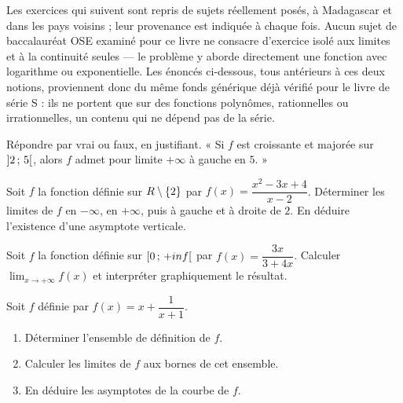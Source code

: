 \begin{annales}
Les exercices qui suivent sont repris de sujets réellement posés, à Madagascar
et dans les pays voisins ; leur provenance est indiquée à chaque fois. Aucun
sujet de baccalauréat OSE examiné pour ce livre ne consacre d'exercice isolé
aux limites et à la continuité seules — le problème y aborde directement une
fonction avec logarithme ou exponentielle. Les énoncés ci-dessous, tous
antérieurs à ces deux notions, proviennent donc du même fonds générique déjà
vérifié pour le livre de série S : ils ne portent que sur des fonctions
polynômes, rationnelles ou irrationnelles, un contenu qui ne dépend pas de la
série.

Répondre par vrai ou faux, en justifiant.
« Si $f$ est croissante et majorée sur $\left]2\,;\,5\right[$, alors $f$ admet
pour limite $+\infty$ à gauche en $5$. »

Soit $f$ la fonction définie sur $R \setminus \{2\}$ par
$f(x) = \dfrac{x^{2}-3x+4}{x-2}$.
Déterminer les limites de $f$ en $-\infty$, en $+\infty$, puis à gauche et à
droite de $2$. En déduire l'existence d'une asymptote verticale.

Soit $f$ la fonction définie sur $\left[0\,;\,+inf\right[$ par
$f(x) = \dfrac{3x}{3+4x}$. Calculer $\lim_{x\to+\infty}f(x)$ et interpréter
graphiquement le résultat.

Soit $f$ définie par $f(x) = x+\dfrac{1}{x+1}$.
\begin{enumerate}[label=\textbf{\alph*)}, leftmargin=*, itemsep=0.15em]
  \item Déterminer l'ensemble de définition de $f$.
  \item Calculer les limites de $f$ aux bornes de cet ensemble.
  \item En déduire les asymptotes de la courbe de $f$.
\end{enumerate}

\medskip
{}
\end{annales}

